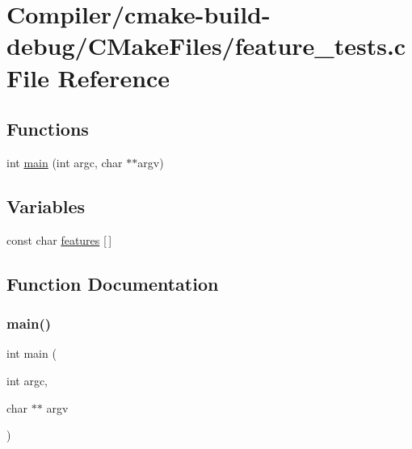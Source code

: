 \hypertarget{_compiler_2cmake-build-debug_2_c_make_files_2feature__tests_8c}{}\section{Compiler/cmake-\/build-\/debug/\+C\+Make\+Files/feature\+\_\+tests.c File Reference}
\label{_compiler_2cmake-build-debug_2_c_make_files_2feature__tests_8c}
\subsection*{Functions}
\begin{DoxyCompactItemize}
\item 
int \mbox{\hyperlink{_compiler_2cmake-build-debug_2_c_make_files_2feature__tests_8c_a3c04138a5bfe5d72780bb7e82a18e627}{main}} (int argc, char $\ast$$\ast$argv)
\end{DoxyCompactItemize}
\subsection*{Variables}
\begin{DoxyCompactItemize}
\item 
const char \mbox{\hyperlink{_compiler_2cmake-build-debug_2_c_make_files_2feature__tests_8c_a1582568e32f689337602a16bf8a5bff0}{features}} \mbox{[}$\,$\mbox{]}
\end{DoxyCompactItemize}


\subsection{Function Documentation}
\mbox{\label{_compiler_2cmake-build-debug_2_c_make_files_2feature__tests_8c_a3c04138a5bfe5d72780bb7e82a18e627}} 
\subsubsection{\texorpdfstring{main()}{main()}}
{\footnotesize\ttfamily int main (\begin{DoxyParamCaption}\item[{int}]{argc,  }\item[{char $\ast$$\ast$}]{argv }\end{DoxyParamCaption})}



